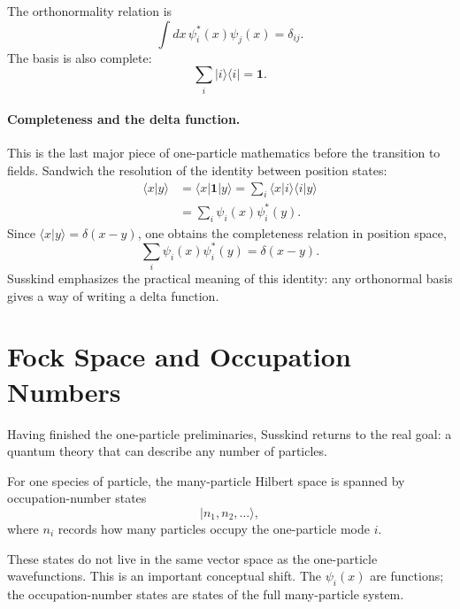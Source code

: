 The orthonormality relation is
\begin{equation}
\int dx\,\psi_i^*(x)\psi_j(x)=\delta_{ij}.
\end{equation}
The basis is also complete:
\begin{equation}
\sum_i |i\rangle\langle i|=\mathbf{1}.
\end{equation}

\paragraph{Completeness and the delta function.}
This is the last major piece of one-particle mathematics before the transition to fields. Sandwich the resolution of the identity between position states:
\begin{align}
\langle x|y\rangle
&=\langle x|\mathbf{1}|y\rangle
=\sum_i \langle x|i\rangle\langle i|y\rangle \\
&=\sum_i \psi_i(x)\psi_i^*(y).
\end{align}
Since $\langle x|y\rangle=\delta(x-y)$, one obtains the completeness relation in position space,
\begin{equation}
\sum_i \psi_i(x)\psi_i^*(y)=\delta(x-y).
\end{equation}
Susskind emphasizes the practical meaning of this identity: any orthonormal basis gives a way of writing a delta function.

\section{Fock Space and Occupation Numbers}

Having finished the one-particle preliminaries, Susskind returns to the real goal: a quantum theory that can describe any number of particles.

\begin{definition}
For one species of particle, the many-particle Hilbert space is spanned by occupation-number states
\begin{equation}
|n_1,n_2,\ldots\rangle,
\end{equation}
where $n_i$ records how many particles occupy the one-particle mode $i$.
\end{definition}

These states do not live in the same vector space as the one-particle wavefunctions. This is an important conceptual shift. The $\psi_i(x)$ are functions; the occupation-number states are states of the full many-particle system.


